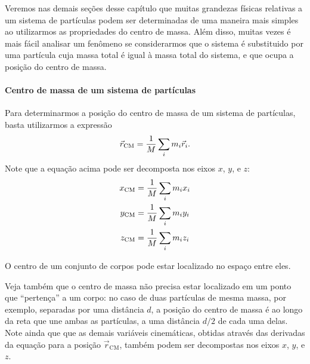 Veremos nas demais seções desse capítulo que muitas grandezas físicas relativas a um sistema de partículas podem ser determinadas de uma maneira mais simples ao utilizarmos as propriedades do centro de massa. Além disso, muitas vezes é mais fácil analisar um fenômeno se considerarmos que o sistema é substituido por uma partícula cuja massa total é igual à massa total do sistema, e que ocupa a posição do centro de massa.

\paragraph{Centro de massa de um sistema de partículas}

Para determinarmos a posição do centro de massa de um sistema de partículas, basta utilizarmos a expressão
\begin{equation}
    \vec{r}_{\rm{CM}} = \frac{1}{M} \sum_{i} m_i \vec{r}_i.
\end{equation}
%
Note que a equação acima pode ser decomposta nos eixos $x$, $y$, e $z$:
\begin{subequations}\label{Eq:CMConjuntoDeParticulasEixos}
\begin{align}
    x_{\rm{CM}} &= \frac{1}{M} \sum_{i} m_i x_i \\
    y_{\rm{CM}} &= \frac{1}{M} \sum_{i} m_i y_i \\
    z_{\rm{CM}} &= \frac{1}{M} \sum_{i} m_i z_i
\end{align}
\end{subequations}

\begin{marginfigure}
\centering
{}
\caption{O centro de um conjunto de corpos pode estar localizado no espaço entre eles.}
\end{marginfigure}

\noindent{}Veja também que o centro de massa não precisa estar localizado em um ponto que ``pertença'' a um corpo: no caso de duas partículas de mesma massa, por exemplo, separadas por uma distância $d$, a posição do centro de massa é ao longo da reta que une ambas as partículas, a uma distância $d/2$ de cada uma delas. Note ainda que que as demais variáveis cinemáticas, obtidas através das derivadas da equação para a posição $\vec{r}_{\text{CM}}$, também podem ser decompostas nos eixos $x$, $y$, e $z$.


